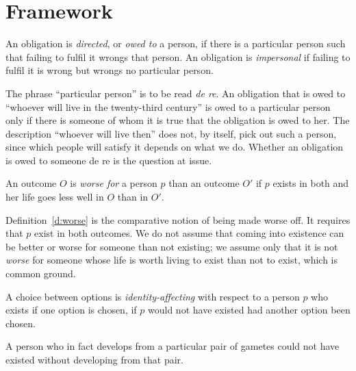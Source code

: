 \documentclass{situationist-preprint}
\begin{document}
\section{Framework}\label{s:framework}

\begin{definition}\label{d:directed}
An obligation is \emph{directed}, or \emph{owed to} a person, if there is a particular person such that failing to fulfil it wrongs that person. An obligation is \emph{impersonal} if failing to fulfil it is wrong but wrongs no particular person.
\end{definition}

The phrase ``particular person'' is to be read \emph{de re}. An obligation that is owed to ``whoever will live in the twenty-third century'' is owed to a particular person only if there is someone of whom it is true that the obligation is owed to her. The description ``whoever will live then'' does not, by itself, pick out such a person, since which people will satisfy it depends on what we do. Whether an obligation is owed to someone de re is the question at issue.

\begin{definition}\label{d:worse}
An outcome $O$ is \emph{worse for} a person $p$ than an outcome $O'$ if $p$ exists in both and her life goes less well in $O$ than in $O'$.
\end{definition}

Definition~\ref{d:worse} is the comparative notion of being made worse off. It requires that $p$ exist in both outcomes. We do not assume that coming into existence can be better or worse for someone than not existing; we assume only that it is not \emph{worse} for someone whose life is worth living to exist than not to exist, which is common ground.

\begin{definition}\label{d:ia}
A choice between options is \emph{identity-affecting} with respect to a person $p$ who exists if one option is chosen, if $p$ would not have existed had another option been chosen.
\end{definition}

\begin{assumption}\label{a:origin}
A person who in fact develops from a particular pair of gametes could not have existed without developing from that pair.
\end{assumption}
\end{document}
